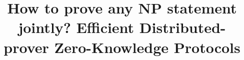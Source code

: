 \documentclass[USenglish,oneside,twocolumn]{article}
\begin{document}
 

%
%
%
%
%
%
%

  \title{\huge How to prove any NP statement jointly? Efficient Distributed-prover Zero-Knowledge Protocols}





%
 

\maketitle

\end{document}
